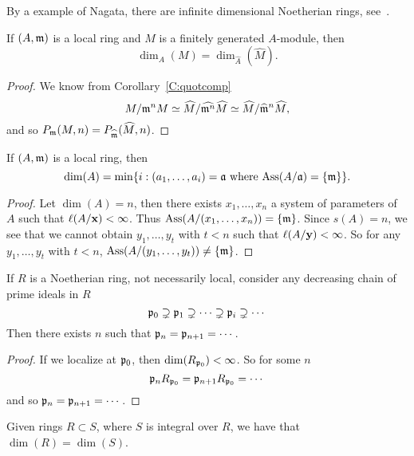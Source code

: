 \documentclass{ximera}
\begin{document}
\begin{remark}
  By a example of Nagata, there are infinite dimensional Noetherian
  rings, see~\cite{mN1962}.
\end{remark}


\begin{corollary}
  If $(A,\mathfrak{m})$ is a local ring and $M$ is a finitely generated
  $A$-module, then
  \[
  \dim_A(M) =\dim_{\hat{A}}(\hat{M}).
  \]
  \begin{proof}
    We know from Corollary~\ref{C:quotcomp}
    \[
    M/\mathfrak{m}^n M \simeq \widehat{M}/\widehat{\mathfrak{m}^n} \widehat{M} \simeq \widehat{M}/ \widehat{\mathfrak{m}}^n\widehat{M},
    \]
    and so $P_{\mathfrak{m}}(M,n) = P_{\widehat{\mathfrak{m}}}(\widehat{M},n)$.
  \end{proof}
\end{corollary}



\begin{corollary}
  If $(A,\mathfrak{m})$ is a local ring, then 
  \[
  \dim(A) = \min\{i: (a_1,\dots,a_i) = \mathfrak{a}\text{ where $\operatorname{Ass}(A/\mathfrak{a}) = \{\mathfrak{m}\}$}\}.
  \]
  \begin{proof}
    Let $\dim(A) = n$, then there exists $x_1,\dots,x_n$ a system of
    parameters of $A$ such that $\ell(A/\mathbf{x}) <\infty$. Thus
    $\operatorname{Ass}(A/(x_1,\dots,x_n)) = \{\mathfrak{m}\}$.  Since $s(A) = n$, we see that
    we cannot obtain $y_1,\dots,y_t$ with $t<n$ such that
    $\ell(A/\mathbf{y})<\infty$.  So for any $y_1,\ldots,y_t$ with $t <
    n$, $\operatorname{Ass}(A/(y_1,\ldots,y_t)) \ne \{\mathfrak{m}\}$.
  \end{proof}
\end{corollary}


\begin{corollary}
  If $R$ is a Noetherian ring, not necessarily local, consider any
  decreasing chain of prime ideals in $R$
  \[
  \mathfrak{p}_0\supsetneq \mathfrak{p}_1\supsetneq \cdots \supsetneq \mathfrak{p}_i\supsetneq \cdots
  \]
  Then there exists $n$ such that $\mathfrak{p}_n = \mathfrak{p}_{n+1} = \cdots$.
  \begin{proof}
    If we localize at $\mathfrak{p}_0$, then $\dim(R_{\mathfrak{p}_0}) <\infty$.  So for some $n$
    \[
    \mathfrak{p}_n R_{\mathfrak{p}_0} = \mathfrak{p}_{n+1} R_{\mathfrak{p}_0} = \cdots
    \]
    and so $\mathfrak{p}_n = \mathfrak{p}_{n+1} = \cdots$.
\end{proof}
\end{corollary}


\begin{corollary}
  Given rings $R\subset S$, where $S$ is integral over $R$, we have
  that $\dim(R) = \dim(S)$.
\end{corollary}
\end{document}
